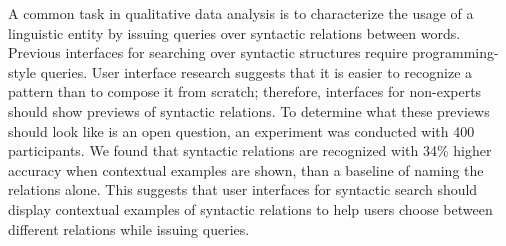 
A common task in qualitative data analysis is to characterize the usage of a linguistic entity by issuing queries over syntactic relations between words.
Previous interfaces for  searching over syntactic structures require programming-style queries. User interface research suggests that it is easier to recognize a pattern than to compose it from scratch; therefore, interfaces for non-experts should show previews of syntactic relations.  To determine what these previews should look like is an open question, an experiment was conducted with  400 participants.  We found that syntactic relations are recognized with 34\% higher accuracy when contextual examples are shown, than a baseline of naming the relations alone.  This suggests that user interfaces for syntactic search should display contextual examples of syntactic relations to help users choose between different relations while issuing queries.
